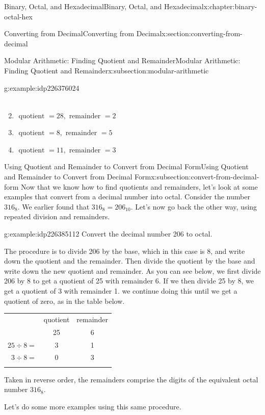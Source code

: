 \documentclass[twoside,10pt,]{book}
\newcommand{\tabularfont}{\relax}
\numberwithin{equation}{section}
\newcommand{\hrulemedium}{\noalign{\hrule height 0.07em}}
\newcommand{\hrulethick} {\noalign{\hrule height 0.11em}}
\begin{document}
\begin{chapterptx}{Binary, Octal, and Hexadecimal}{}{Binary, Octal, and Hexadecimal}{}{}{x:chapter:binary-octal-hex}
\begin{sectionptx}{Converting from Decimal}{}{Converting from Decimal}{}{}{x:section:converting-from-decimal}
\begin{subsectionptx}{Modular Arithmetic: Finding Quotient and Remainder}{}{Modular Arithmetic: Finding Quotient and Remainder}{}{}{x:subsection:modular-arithmetic}
\begin{example}{}{g:example:idp226376024}
\begin{enumerate}
\begin{align*}
\end{align*}
%
\item{}\(\displaystyle \text{ quotient }=28,\text{ remainder }=2\)%
\item{}\(\displaystyle \text{ quotient }=8,\text{ remainder }=5\)%
\item{}\(\displaystyle \text{ quotient }=11,\text{ remainder }=3\)%
\end{enumerate}
\end{example}
\end{subsectionptx}
%
%
\typeout{************************************************}
\typeout{************************************************}
%
\begin{subsectionptx}{Using Quotient and Remainder to Convert from Decimal Form}{}{Using Quotient and Remainder to Convert from Decimal Form}{}{}{x:subsection:convert-from-decimal-form}
Now that we know how to find quotients and remainders, let's look at some examples that convert from a decimal number into octal.  Consider the number \(316_8\).  We earlier found that \(316_8=206_{10}\).  Let's now go back the other way, using repeated division and remainders.%
\begin{example}{}{g:example:idp226385112}%
Convert the decimal number 206 to octal.%
\par
The procedure is to divide 206 by the base, which in this case is 8, and write down the quotient and the remainder.  Then divide the quotient by the base and write down the new quotient and remainder.  As you can see below, we first divide 206 by 8 to get a quotient of 25 with remainder 6.  If we then divide 25 by 8, we get a quotient of 3 with remainder 1.  we continue doing this until we get a quotient of zero, as in the table below. \begin{center}%
{\tabularfont%
\begin{tabular}{ccc}\hrulethick
&quotient&remainder\tabularnewline\hrulemedium
\multicolumn{1}{r}{\(206\div 8=\)}&25&6\tabularnewline[0pt]
\multicolumn{1}{r}{\(25\div 8=\)}&3&1\tabularnewline[0pt]
\multicolumn{1}{r}{\(3\div 8 =\)}&0&3\tabularnewline\hrulethick
\end{tabular}
}%
\end{center}%
%
\par
Taken in reverse order, the remainders comprise the digits of the equivalent octal number \(316_8\).%
\end{example}
Let's do some more examples using this same procedure.%

\end{subsectionptx}
\end{sectionptx}
\end{chapterptx}
\end{document}
